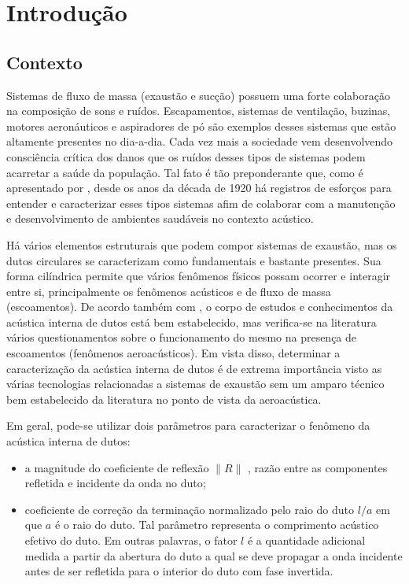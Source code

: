 \chapter{Introdução}
\label{chapter:introdcao}

\section{Contexto}

Sistemas de fluxo de massa (exaustão e sucção) possuem uma forte colaboração na composição de sons e ruídos. Escapamentos, sistemas de ventilação, buzinas, motores aeronáuticos e aspiradores de pó são exemplos desses sistemas que estão altamente presentes no dia-a-dia. Cada vez mais a sociedade vem desenvolvendo consciência crítica dos danos que os ruídos desses tipos de sistemas podem acarretar a saúde da população. Tal fato é tão preponderante que, como é apresentado por , desde os anos da década de 1920 há registros de esforços para entender e caracterizar esses tipos sistemas afim de colaborar com a manutenção e desenvolvimento de ambientes saudáveis no contexto acústico.

Há vários elementos estruturais que podem compor sistemas de exaustão, mas os dutos circulares se caracterizam como fundamentais e bastante presentes. Sua forma cilíndrica permite que vários fenômenos físicos possam ocorrer e interagir entre si, principalmente os fenômenos acústicos e de fluxo de massa (escoamentos). De acordo também com , o corpo de estudos e conhecimentos da acústica interna de dutos está bem estabelecido, mas verifica-se na literatura vários questionamentos sobre o funcionamento do mesmo na presença de escoamentos (fenômenos aeroacústicos). Em vista disso, determinar a caracterização da acústica interna de dutos é de extrema importância visto as várias tecnologias relacionadas a sistemas de exaustão sem um amparo técnico bem estabelecido da literatura no ponto de vista da aeroacústica.

Em geral, pode-se utilizar dois parâmetros para caracterizar o fenômeno da acústica interna de dutos:

\begin{itemize}
    \item a magnitude do coeficiente de reflexão $\|R\|$ , razão entre as componentes refletida e incidente da onda no duto;
    
    \item coeficiente de correção da terminação normalizado pelo raio do duto $l/a$  em que $a$ é o raio do duto. Tal parâmetro representa o comprimento acústico efetivo do duto. Em outras palavras, o fator $l$ é a quantidade adicional medida a partir da abertura do duto a qual se deve propagar a onda incidente antes de ser refletida para o interior do duto com fase invertida.
\end{itemize}


